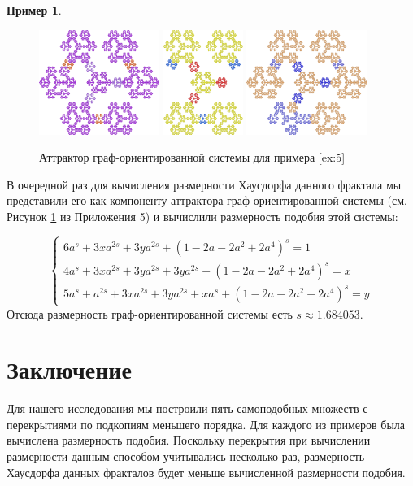 \documentclass[a4paper,14pt]{extarticle} %
\newcommand{\0}{\varnothing}
\newcommand{\8}{\infty}
\theoremstyle{definition}
\newtheorem{example}{Пример}
\begin{document}
\begin{example}
\begin{figure}[H]
    \centering
    \includegraphics[width=0.35\textwidth]{EXTREME_5.1.png}
    \hfill
    \includegraphics[width=0.23\textwidth]{EXTREME_5.2.png}
    \hfill
    \includegraphics[width=0.35\textwidth]{EXTREME_5.3.png}
    \caption{Аттрактор граф-ориентированной системы для примера \ref{ex:5}}
    \label{fig:primer5}
\end{figure}

В очередной раз для вычисления размерности Хаусдорфа данного фрактала мы  представили его как компоненту аттрактора граф-ори\-ен\-ти\-ро\-ван\-ной системы (см. Рисунок \ref{fig:primer5} из Приложения 5) и вычислили размерность подобия этой системы:

$$
\begin{cases}
6a^s+3xa^{2s}+3ya^{2s}+(1-2a-2a^2+2a^4)^s=1\\
4a^s+3xa^{2s}+3ya^{2s}+3ya^{2s}+(1-2a-2a^2+2a^4)^s=x\\
5a^s+a^{2s}+3xa^{2s}+3ya^{2s}+xa^s+(1-2a-2a^2+2a^4)^s=y
\end{cases}
$$
Отсюда размерность граф-ориентированной системы есть $s\approx1.684053$.
\end{example}

\newpage
\section*{Заключение}
Для нашего исследования мы построили пять самоподобных множеств с перекрытиями по подкопиям меньшего порядка. 
Для каждого из примеров была вычислена размерность подобия. Поскольку перекрытия при вычислении размерности данным способом учитывались несколько раз, размерность Хаусдорфа данных фракталов будет меньше вычисленной размерности подобия.
\end{document}
